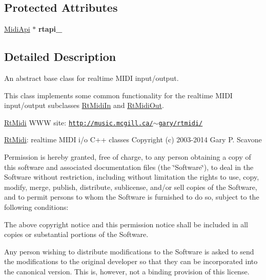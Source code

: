 \subsection*{Protected Attributes}
\begin{DoxyCompactItemize}
\item 
\hyperlink{class_midi_api}{Midi\+Api} $\ast$ {\bfseries rtapi\+\_\+}\hypertarget{class_rt_midi_ae5dad4d720ff6912b819ca608d2c9cd6}{}\label{class_rt_midi_ae5dad4d720ff6912b819ca608d2c9cd6}

\end{DoxyCompactItemize}


\subsection{Detailed Description}
An abstract base class for realtime M\+I\+DI input/output. 

This class implements some common functionality for the realtime M\+I\+DI input/output subclasses \hyperlink{class_rt_midi_in}{Rt\+Midi\+In} and \hyperlink{class_rt_midi_out}{Rt\+Midi\+Out}.

\hyperlink{class_rt_midi}{Rt\+Midi} W\+WW site\+: \href{http://music.mcgill.ca/~gary/rtmidi/}{\tt http\+://music.\+mcgill.\+ca/$\sim$gary/rtmidi/}

\hyperlink{class_rt_midi}{Rt\+Midi}\+: realtime M\+I\+DI i/o C++ classes Copyright (c) 2003-\/2014 Gary P. Scavone

Permission is hereby granted, free of charge, to any person obtaining a copy of this software and associated documentation files (the \char`\"{}\+Software\char`\"{}), to deal in the Software without restriction, including without limitation the rights to use, copy, modify, merge, publish, distribute, sublicense, and/or sell copies of the Software, and to permit persons to whom the Software is furnished to do so, subject to the following conditions\+:

The above copyright notice and this permission notice shall be included in all copies or substantial portions of the Software.

Any person wishing to distribute modifications to the Software is asked to send the modifications to the original developer so that they can be incorporated into the canonical version. This is, however, not a binding provision of this license.


